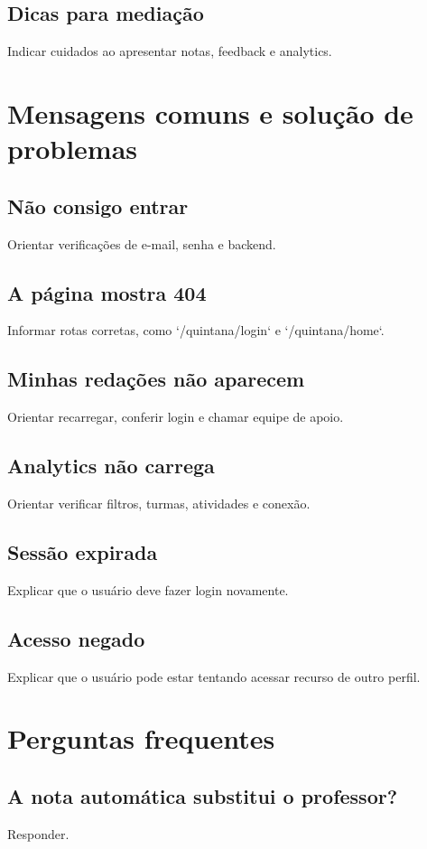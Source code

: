 \documentclass[12pt,a4paper]{article}
\begin{document}
\subsection{Dicas para mediação}
Indicar cuidados ao apresentar notas, feedback e analytics.

\section{Mensagens comuns e solução de problemas}

\subsection{Não consigo entrar}
Orientar verificações de e-mail, senha e backend.

\subsection{A página mostra 404}
Informar rotas corretas, como `/quintana/login` e `/quintana/home`.

\subsection{Minhas redações não aparecem}
Orientar recarregar, conferir login e chamar equipe de apoio.

\subsection{Analytics não carrega}
Orientar verificar filtros, turmas, atividades e conexão.

\subsection{Sessão expirada}
Explicar que o usuário deve fazer login novamente.

\subsection{Acesso negado}
Explicar que o usuário pode estar tentando acessar recurso de outro perfil.

\section{Perguntas frequentes}

\subsection{A nota automática substitui o professor?}
Responder.
\end{document}
